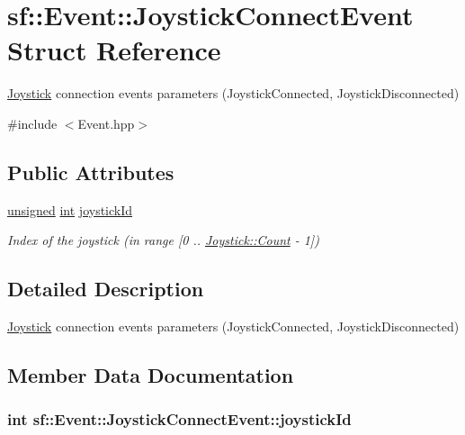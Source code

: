 \hypertarget{structsf_1_1_event_1_1_joystick_connect_event}{\section{sf\-:\-:Event\-:\-:Joystick\-Connect\-Event Struct Reference}
\label{structsf_1_1_event_1_1_joystick_connect_event}
}


\hyperlink{classsf_1_1_joystick}{Joystick} connection events parameters (Joystick\-Connected, Joystick\-Disconnected)  




{\ttfamily \#include $<$Event.\-hpp$>$}

\subsection*{Public Attributes}
\begin{DoxyCompactItemize}
\item 
\hyperlink{curses_8priv_8h_aca40206900cfc164654362fa8d4ad1e6}{unsigned} \hyperlink{term__entry_8h_ad65b480f8c8270356b45a9890f6499ae}{int} \hyperlink{structsf_1_1_event_1_1_joystick_connect_event_a08e58e8559d3e4fe4654855fec79194b}{joystick\-Id}
\begin{DoxyCompactList}\small\item\em Index of the joystick (in range \mbox{[}0 .. \hyperlink{classsf_1_1_joystick_aa49548ab614125923944b5d340f67a77a58bb2e8f3749310d61097e4361bc0ba8}{Joystick\-::\-Count} -\/ 1\mbox{]}) \end{DoxyCompactList}\end{DoxyCompactItemize}


\subsection{Detailed Description}
\hyperlink{classsf_1_1_joystick}{Joystick} connection events parameters (Joystick\-Connected, Joystick\-Disconnected) 

\subsection{Member Data Documentation}
\hypertarget{structsf_1_1_event_1_1_joystick_connect_event_a08e58e8559d3e4fe4654855fec79194b}{
\subsubsection[{joystick\-Id}]{ {\bf int} sf\-::\-Event\-::\-Joystick\-Connect\-Event\-::joystick\-Id}}\label{structsf_1_1_event_1_1_joystick_connect_event_a08e58e8559d3e4fe4654855fec79194b}


